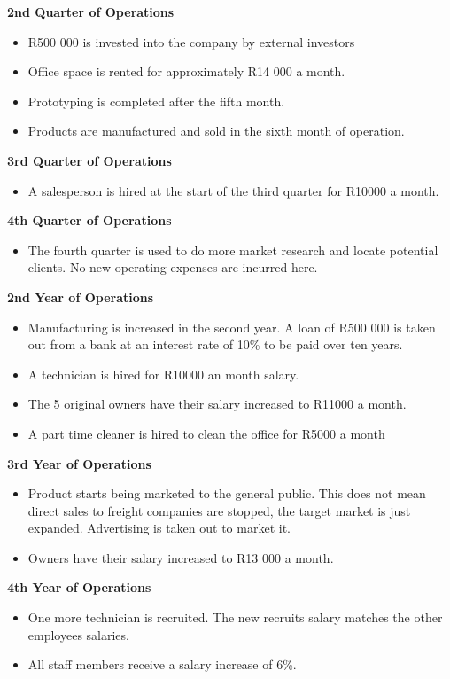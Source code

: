 {\bfseries 2nd Quarter of Operations}
\begin{itemize}
\item R500 000 is invested into the company by external investors
\item Office space is rented for approximately R14 000 a month.
\item Prototyping is completed after the fifth month.
\item Products are manufactured and sold in the sixth month of operation.
\end{itemize}

{\bfseries 3rd Quarter of Operations}
\begin{itemize}
\item A salesperson is hired at the start of the third quarter for R10000 a month.
\end{itemize}

{\bfseries 4th Quarter of Operations}
\begin{itemize}
\item The fourth quarter is used to do more market research and locate potential clients. No new operating expenses are incurred here.
\end{itemize}

{\bfseries 2nd Year of Operations}
\begin{itemize}
\item Manufacturing is increased in the second year. A loan of R500 000 is taken out from a bank at an interest rate of 10\% to be paid over ten years. 
\item A technician is hired for R10000 an month salary.
\item The 5 original owners have their salary increased to R11000 a month.
\item A part time cleaner is hired to clean the office for R5000 a month
\end{itemize}

{\bfseries 3rd Year of Operations}
\begin{itemize}
\item Product starts being marketed to the general public. This does not mean direct sales to freight companies are stopped, the target market is just expanded. Advertising is taken out to market it.
\item Owners have their salary increased to R13 000 a month.
\end{itemize}

{\bfseries 4th Year of Operations}
\begin{itemize}
\item One more technician is recruited. The new recruits salary matches the other employees salaries.
\item All staff members receive a salary increase of 6\%.
\end{itemize}

